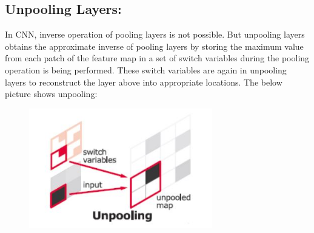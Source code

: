 \documentclass{IEEEtran}
\begin{document}
\subsection{\textbf{Unpooling Layers:}}
In CNN, inverse operation of pooling layers is not possible. But unpooling layers obtains the approximate inverse of pooling layers by storing the maximum value from each patch of the feature map in a set of switch variables during the pooling operation is being performed. These switch variables  are again in unpooling layers to reconstruct the layer above into appropriate locations. The below picture shows unpooling:

\begin{figure}[h]
    \centering
    \captionsetup{justification=centering}
    \includegraphics[width=8cm]{unpool}
    \caption{}
    \label{fig:}
\end{figure}
  
\end{document}
